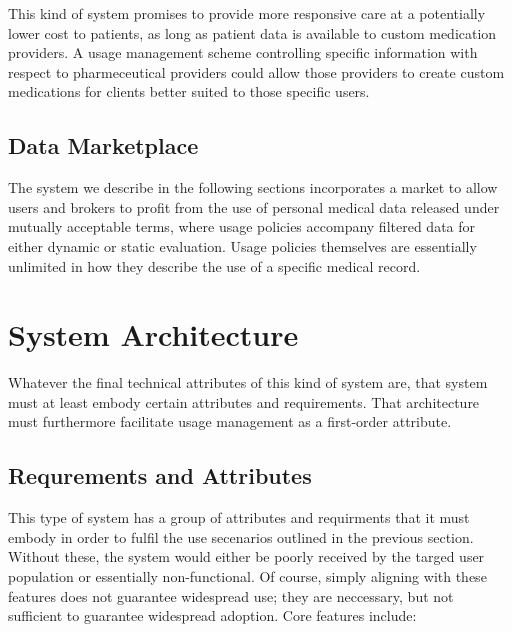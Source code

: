 \documentclass[10pt, conference, compsocconf]{IEEEtran}
\begin{document}
This kind of system promises to provide more responsive care at a potentially lower cost to patients, as long as patient data is available to custom medication providers.  A usage management scheme controlling specific information with respect to pharmeceutical providers could allow those providers to create custom medications for clients  better suited to those specific users.

\subsection{Data Marketplace}
The system we describe in the following sections incorporates a market to allow users and brokers to profit from the use of personal medical data released under mutually acceptable terms, where usage policies accompany filtered data for either dynamic or static evaluation.  Usage policies themselves are essentially unlimited in how they describe the use of a specific medical record.

\section{System Architecture}
Whatever the final technical attributes of this kind of system are, that system must at least embody certain attributes and requirements.  That architecture must furthermore facilitate usage management as a first-order attribute.

\subsection{Requrements and Attributes}
This type of system has a group of attributes and requirments that it must embody in order to fulfil the use secenarios outlined in the previous section.  Without these, the system would either be poorly received by the targed user population or essentially non-functional.  Of course, simply aligning with these features does not guarantee widespread use; they are neccessary, but not sufficient to guarantee widespread adoption.  Core features include:
\end{document}
